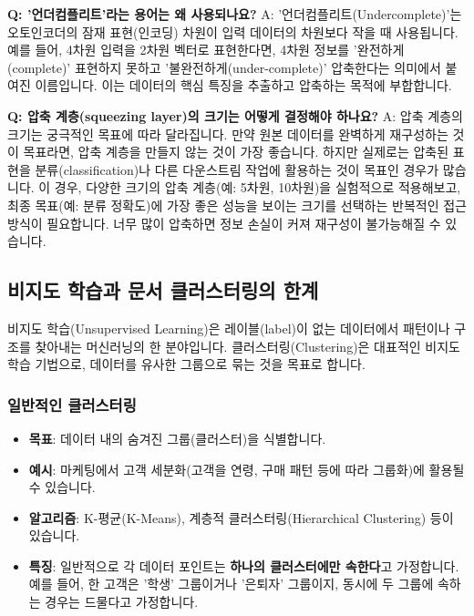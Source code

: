 \documentclass[11pt,a4paper]{article}
\theoremstyle{definition}
\begin{document}
\begin{faqbox}
\textbf{Q: '언더컴플리트'라는 용어는 왜 사용되나요?}
A: '언더컴플리트(Undercomplete)'는 오토인코더의 잠재 표현(인코딩) 차원이 입력 데이터의 차원보다 작을 때 사용됩니다. 예를 들어, 4차원 입력을 2차원 벡터로 표현한다면, 4차원 정보를 '완전하게(complete)' 표현하지 못하고 '불완전하게(under-complete)' 압축한다는 의미에서 붙여진 이름입니다. 이는 데이터의 핵심 특징을 추출하고 압축하는 목적에 부합합니다.

\textbf{Q: 압축 계층(squeezing layer)의 크기는 어떻게 결정해야 하나요?}
A: 압축 계층의 크기는 궁극적인 목표에 따라 달라집니다. 만약 원본 데이터를 완벽하게 재구성하는 것이 목표라면, 압축 계층을 만들지 않는 것이 가장 좋습니다. 하지만 실제로는 압축된 표현을 분류(classification)나 다른 다운스트림 작업에 활용하는 것이 목표인 경우가 많습니다. 이 경우, 다양한 크기의 압축 계층(예: 5차원, 10차원)을 실험적으로 적용해보고, 최종 목표(예: 분류 정확도)에 가장 좋은 성능을 보이는 크기를 선택하는 반복적인 접근 방식이 필요합니다. 너무 많이 압축하면 정보 손실이 커져 재구성이 불가능해질 수 있습니다.
\end{faqbox}

\newpage
\subsection*{비지도 학습과 문서 클러스터링의 한계}
\begin{infobox} %
비지도 학습(Unsupervised Learning)은 레이블(label)이 없는 데이터에서 패턴이나 구조를 찾아내는 머신러닝의 한 분야입니다.
클러스터링(Clustering)은 대표적인 비지도 학습 기법으로, 데이터를 유사한 그룹으로 묶는 것을 목표로 합니다.
\end{infobox}

\subsubsection*{일반적인 클러스터링}
\begin{itemize}
    \item \textbf{목표}: 데이터 내의 숨겨진 그룹(클러스터)을 식별합니다.
    \item \textbf{예시}: 마케팅에서 고객 세분화(고객을 연령, 구매 패턴 등에 따라 그룹화)에 활용될 수 있습니다.
    \item \textbf{알고리즘}: K-평균(K-Means), 계층적 클러스터링(Hierarchical Clustering) 등이 있습니다.
    \item \textbf{특징}: 일반적으로 각 데이터 포인트는 \textbf{하나의 클러스터에만 속한다}고 가정합니다. 예를 들어, 한 고객은 '학생' 그룹이거나 '은퇴자' 그룹이지, 동시에 두 그룹에 속하는 경우는 드물다고 가정합니다.
\end{itemize}
\end{document}
